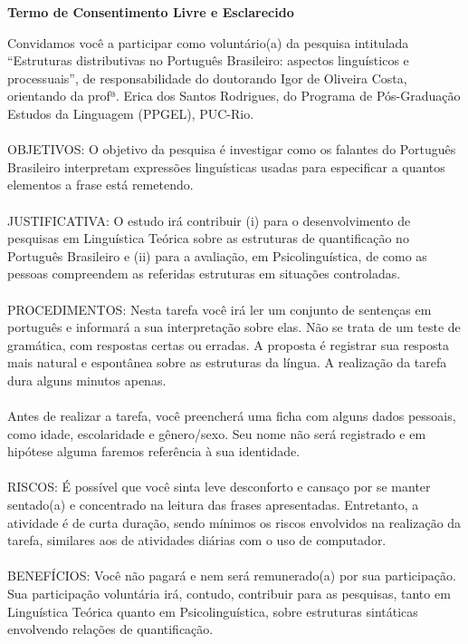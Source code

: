 \begin{center}
  \textbf{Termo de Consentimento Livre e Esclarecido}
\end{center}
Convidamos você a participar como voluntário(a) da pesquisa intitulada ``Estruturas distributivas no Português Brasileiro: aspectos linguísticos e processuais'', de responsabilidade do doutorando Igor de Oliveira Costa, orientando da profª. Erica dos Santos Rodrigues, do Programa de Pós-Graduação Estudos da Linguagem (PPGEL), PUC-Rio.
\\
\\
OBJETIVOS: O objetivo da pesquisa é investigar como os falantes do Português Brasileiro interpretam expressões linguísticas usadas para especificar a quantos elementos a frase está remetendo.
\\
\\
JUSTIFICATIVA: O estudo irá contribuir (i) para o desenvolvimento de pesquisas em Linguística Teórica sobre as estruturas de quantificação no Português Brasileiro e (ii) para a avaliação, em Psicolinguística, de como as pessoas compreendem as referidas estruturas em situações controladas.
\\
\\
PROCEDIMENTOS: Nesta tarefa você irá ler um conjunto de sentenças em português e informará a sua interpretação sobre elas. Não se trata de um teste de gramática, com respostas certas ou erradas. A proposta é registrar sua resposta mais natural e espontânea sobre as estruturas da língua. A realização da tarefa dura alguns minutos apenas.
\\
\\
Antes de realizar a tarefa, você preencherá uma ficha com alguns dados pessoais, como idade, escolaridade e gênero/sexo. Seu nome não será registrado e em hipótese alguma faremos referência à sua identidade.
\\
\\
RISCOS: É possível que você sinta leve desconforto e cansaço por se manter sentado(a) e concentrado na leitura das frases apresentadas. Entretanto, a atividade é de curta duração, sendo mínimos os riscos envolvidos na realização da tarefa, similares aos de atividades diárias com o uso de computador.
\\
\\
BENEFÍCIOS: Você não pagará e nem será remunerado(a) por sua participação. Sua participação voluntária irá, contudo, contribuir para as pesquisas, tanto em Linguística Teórica quanto em Psicolinguística, sobre estruturas sintáticas envolvendo relações de quantificação.
